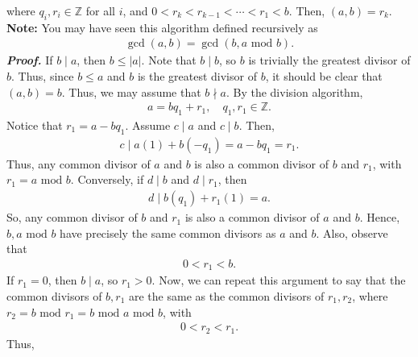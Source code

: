 \documentclass{report}
\begin{document}
\begin{itemize}
            where $q_{i}, r_{i} \in \mathbb{Z}$ for all $i$, and $ 0 < r_{k} < r_{k-1} < \cdots < r_{1} < b$. Then, $(a,b) = r_{k}$.
            \bigbreak \noindent 
            \textbf{Note:} You may have seen this algorithm defined recursively as
            \begin{align*}
                \gcd(a,b) = \gcd(b, a \text{ mod } b)
            .\end{align*}
            \bigbreak \noindent 
            \textbf{\textit{Proof.}} If $b \mid a$, then $b \leq \left\lvert a \right\rvert$. Note that $b \mid b$, so $b$ is trivially the greatest divisor of $b$. Thus, since $b \leq a$ and $b$ is the greatest divisor of $b$, it should be clear that $(a,b)= b$. Thus, we may assume that $b \nmid a$. 
            \bigbreak \noindent 
            By the division algorithm, 
            \begin{align*}
                a = bq_{1} + r_{1}, \quad q_{1}, r_{1} \in \mathbb{Z}
            .\end{align*}
            Notice that $r_{1} = a-bq_{1}$. Assume $c \mid a$ and $c \mid b$. Then,
            \begin{align*}
                c \mid a(1) + b(-q_{1}) = a - bq_{1} = r_{1}
            .\end{align*}
            Thus, any common divisor of $a$ and $b$ is also a common divisor of $b$ and $r_{1}$, with $r_{1} = a \text{ mod } b$. Conversely, if $d \mid b$ and $d \mid r_{1}$, then
            \begin{align*}
                d \mid b(q_{1}) + r_{1}(1) = a
            .\end{align*}
            So, any common divisor of $b$ and $r_{1}$ is also a common divisor of $a$ and $b$. Hence, $b, a \text{ mod } b$ have precisely the same common divisors as $a$ and $b$.
            \bigbreak \noindent 
            Also, observe that
            \begin{align*}
                0 < r_{1} < b
            .\end{align*}
            If $r_{1} = 0$, then $b \mid a$, so $r_{1} > 0$. Now, we can repeat this argument to say that the common divisors of $b,r_{1}$ are the same as the common divisors of $r_{1}, r_{2}$, where $r_{2} = b \text{ mod } r_{1} = b \text{ mod } a \text{ mod } b$, with
            \begin{align*}
                0 < r_{2} < r_{1}
            .\end{align*}
            Thus,
            \begin{align*}

\end{align*}
\end{itemize}
\end{document}
